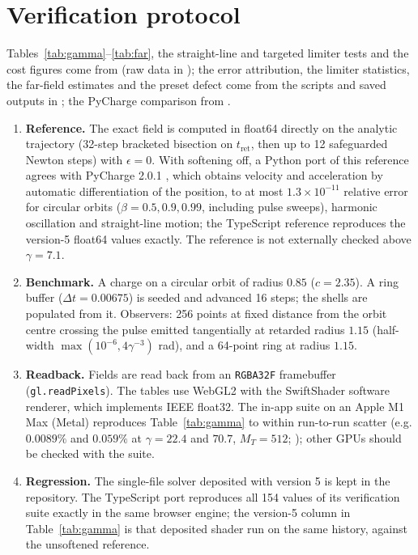 \documentclass[11pt, a4paper]{article}
\begin{document}
\section{Verification protocol}\label{sec:protocol}
Tables~\ref{tab:gamma}--\ref{tab:far}, the straight-line and targeted limiter tests and the cost figures come from  (raw data in ); the error attribution, the limiter statistics, the far-field estimates and the preset defect come from the scripts and saved outputs in ; the PyCharge comparison from .
\begin{enumerate}
    \item \textbf{Reference.} The exact field is computed in float64 directly on the analytic trajectory (32-step bracketed bisection on $t_{\text{ret}}$, then up to 12 safeguarded Newton steps) with $\epsilon = 0$. With softening off, a Python port of this reference agrees with PyCharge 2.0.1 \cite{pycharge2022}, which obtains velocity and acceleration by automatic differentiation of the position, to at most $1.3\times10^{-11}$ relative error for circular orbits ($\beta = 0.5, 0.9, 0.99$, including pulse sweeps), harmonic oscillation and straight-line motion; the TypeScript reference reproduces the version-5 float64 values exactly. The reference is not externally checked above $\gamma = 7.1$.
    \item \textbf{Benchmark.} A charge on a circular orbit of radius $0.85$ ($c = 2.35$). A ring buffer ($\Delta t = 0.00675$) is seeded and advanced 16 steps; the shells are populated from it. Observers: 256 points at fixed distance from the orbit centre crossing the pulse emitted tangentially at retarded radius $1.15$ (half-width $\max(10^{-6}, 4\gamma^{-3})$ rad), and a 64-point ring at radius $1.15$.
    \item \textbf{Readback.} Fields are read back from an \texttt{RGBA32F} framebuffer (\texttt{gl.readPixels}). The tables use WebGL2 with the SwiftShader software renderer, which implements IEEE float32. The in-app suite on an Apple M1 Max (Metal) reproduces Table~\ref{tab:gamma} to within run-to-run scatter (e.g. $0.0089\%$ and $0.059\%$ at $\gamma = 22.4$ and $70.7$, $M_T = 512$; ); other GPUs should be checked with the suite.
    \item \textbf{Regression.} The single-file solver deposited with version 5 is kept in the repository. The TypeScript port reproduces all 154 values of its verification suite exactly in the same browser engine; the version-5 column in Table~\ref{tab:gamma} is that deposited shader run on the same history, against the unsoftened reference.
\end{enumerate}
\end{document}
